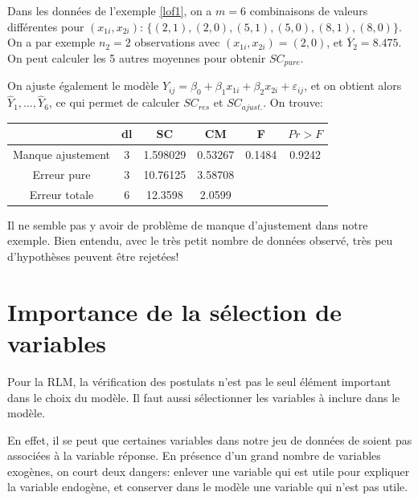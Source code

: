 \vspace{0.05in}
\begin{exemple}
Dans les données de l'exemple \ref{lof1}, on a $m=6$ combinaisons de valeurs différentes pour $(x_{1i},x_{2i})$: $\{ (2,1),(2,0),  (5,1), (5,0), (8,1),(8,0)\}$. \\
On a par exemple $n_2=2$ observations avec $(x_{1i},x_{2i})=(2,0)$, et $\overline{Y}_2=8.475$.\\
On peut calculer les 5 autres moyennes pour obtenir $SC_{pure}$.

On ajuste également le modèle $Y_{ij}=\beta_0+\beta_1x_{1i}+\beta_2x_{2i}+\varepsilon_{ij}$, et on obtient alors $\hat{Y}_1, \ldots, \hat{Y}_6$, ce qui permet de calculer $SC_{res}$ et $SC_{ajust.}$. On trouve:

\begin{center}
\begin{tabular}{||c||c|c|c|c|c||}\hline\hline
  & dl & SC & CM & F & $Pr>F$ \\ \hline\hline
 Manque ajustement &  3 &    1.598029 &    0.53267  &     0.1484   &
 0.9242 \\
 Erreur pure  &  3 &   10.76125 &    3.58708  & & \\
 Erreur totale &  6 &   12.3598 &   2.0599   & & \\ \hline\hline
\end{tabular}
\vspace{5mm}
\end{center}

\vspace{-0.05in}
Il ne semble pas y avoir de problème de manque d'ajustement dans notre exemple. Bien entendu, avec le très petit nombre de données observé, très peu d'hypothèses peuvent \^etre rejetées!
\end{exemple}

\newpage
\section{Importance de la sélection de variables}

Pour la RLM, la vérification des postulats n'est pas le seul élément important dans le choix du modèle. Il faut aussi sélectionner les variables à inclure dans le modèle.

En effet, il se peut que certaines variables dans notre jeu de données de soient pas associées à la variable réponse.
En présence d'un grand nombre de variables exogènes, on court deux dangers: enlever une variable qui est utile pour expliquer la variable endogène, et conserver dans le modèle une variable qui n'est pas utile.

